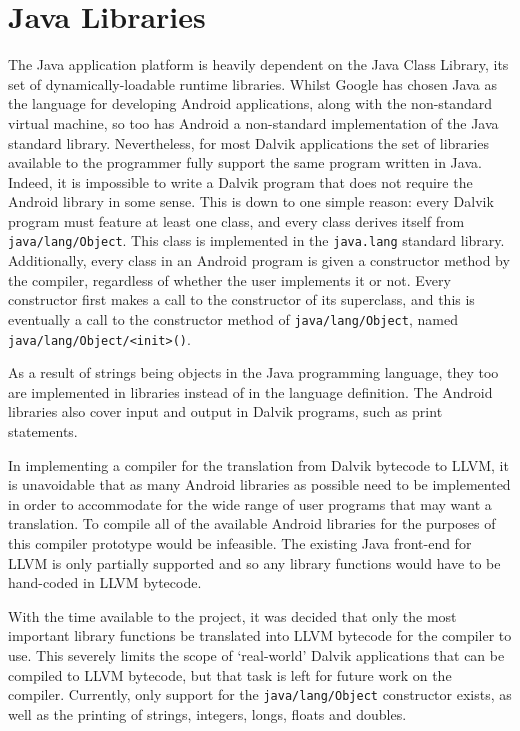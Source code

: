 \section {Java Libraries}
\label{sec:javalib}

The Java application platform is heavily dependent on the Java Class Library, its set of dynamically-loadable runtime libraries. Whilst Google has chosen Java as the language for developing Android applications, along with the non-standard virtual machine, so too has Android a non-standard implementation of the Java standard library. Nevertheless, for most Dalvik applications the set of libraries available to the programmer fully support the same program written in Java. Indeed, it is impossible to write a Dalvik program that does not require the Android library in some sense. This is down to one simple reason: every Dalvik program must feature at least one class, and every class derives itself from \verb|java/lang/Object|. This class is implemented in the \verb|java.lang| standard library. Additionally, every class in an Android program is given a constructor method by the compiler, regardless of whether the user implements it or not. Every constructor first makes a call to the constructor of its superclass, and this is eventually a call to the constructor method of \verb|java/lang/Object|, named \verb|java/lang/Object/<init>()|.

As a result of strings being objects in the Java programming language, they too are implemented in libraries instead of in the language definition. The Android libraries also cover input and output in Dalvik programs, such as print statements.

In implementing a compiler for the translation from Dalvik bytecode to LLVM, it is unavoidable that as many Android libraries as possible need to be implemented in order to accommodate for the wide range of user programs that may want a translation. To compile all of the available Android libraries for the purposes of this compiler prototype would be infeasible. The existing Java front-end for LLVM is only partially supported and so any library functions would have to be hand-coded in LLVM bytecode.

With the time available to the project, it was decided that only the most important library functions be translated into LLVM bytecode for the compiler to use. This severely limits the scope of `real-world' Dalvik applications that can be compiled to LLVM bytecode, but that task is left for future work on the compiler. Currently, only support for the \verb|java/lang/Object| constructor exists, as well as the printing of strings, integers, longs, floats and doubles.

